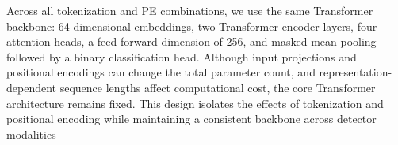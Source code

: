 Across all tokenization and PE combinations, we use the same Transformer backbone: 64-dimensional embeddings, two Transformer encoder layers, four attention heads, a feed-forward dimension of 256, and masked mean pooling followed by a binary classification head. Although input projections and positional encodings can change the total parameter count, and representation-dependent sequence lengths affect computational cost, the core Transformer architecture remains fixed. This design isolates the effects of tokenization and positional encoding while maintaining a consistent backbone across detector modalities



